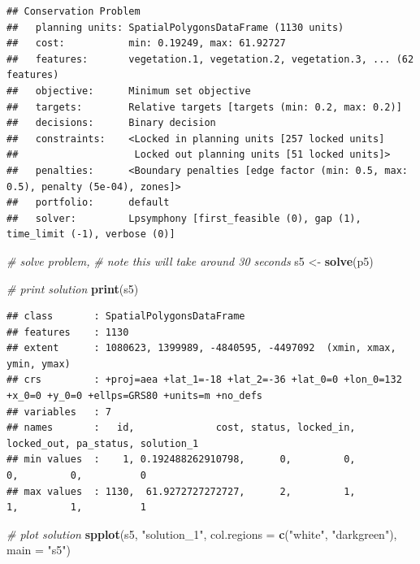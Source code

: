 \documentclass[12pt,]{book}
\newenvironment{Shaded}{\begin{snugshade}}{\end{snugshade}}
\newcommand{\KeywordTok}[1]{\textcolor[rgb]{0.13,0.29,0.53}{\textbf{#1}}}
\newcommand{\DataTypeTok}[1]{\textcolor[rgb]{0.13,0.29,0.53}{#1}}
\newcommand{\StringTok}[1]{\textcolor[rgb]{0.31,0.60,0.02}{#1}}
\newcommand{\CommentTok}[1]{\textcolor[rgb]{0.56,0.35,0.01}{\textit{#1}}}
\newcommand{\NormalTok}[1]{#1}
\begin{document}
\begin{verbatim}
## Conservation Problem
##   planning units: SpatialPolygonsDataFrame (1130 units)
##   cost:           min: 0.19249, max: 61.92727
##   features:       vegetation.1, vegetation.2, vegetation.3, ... (62 features)
##   objective:      Minimum set objective 
##   targets:        Relative targets [targets (min: 0.2, max: 0.2)]
##   decisions:      Binary decision 
##   constraints:    <Locked in planning units [257 locked units]
##                    Locked out planning units [51 locked units]>
##   penalties:      <Boundary penalties [edge factor (min: 0.5, max: 0.5), penalty (5e-04), zones]>
##   portfolio:      default
##   solver:         Lpsymphony [first_feasible (0), gap (1), time_limit (-1), verbose (0)]
\end{verbatim}

\begin{Shaded}
\begin{Highlighting}[]
\CommentTok{# solve problem,}
\CommentTok{# note this will take around 30 seconds}
\NormalTok{s5 <-}\StringTok{ }\KeywordTok{solve}\NormalTok{(p5)}

\CommentTok{# print solution}
\KeywordTok{print}\NormalTok{(s5)}
\end{Highlighting}
\end{Shaded}

\begin{verbatim}
## class       : SpatialPolygonsDataFrame 
## features    : 1130 
## extent      : 1080623, 1399989, -4840595, -4497092  (xmin, xmax, ymin, ymax)
## crs         : +proj=aea +lat_1=-18 +lat_2=-36 +lat_0=0 +lon_0=132 +x_0=0 +y_0=0 +ellps=GRS80 +units=m +no_defs 
## variables   : 7
## names       :   id,              cost, status, locked_in, locked_out, pa_status, solution_1 
## min values  :    1, 0.192488262910798,      0,         0,          0,         0,          0 
## max values  : 1130,  61.9272727272727,      2,         1,          1,         1,          1
\end{verbatim}

\begin{Shaded}
\begin{Highlighting}[]
\CommentTok{# plot solution}
\KeywordTok{spplot}\NormalTok{(s5, }\StringTok{"solution_1"}\NormalTok{, }\DataTypeTok{col.regions =} \KeywordTok{c}\NormalTok{(}\StringTok{"white"}\NormalTok{, }\StringTok{"darkgreen"}\NormalTok{), }\DataTypeTok{main =} \StringTok{"s5"}\NormalTok{)}
\end{Highlighting}
\end{Shaded}
\end{document}
